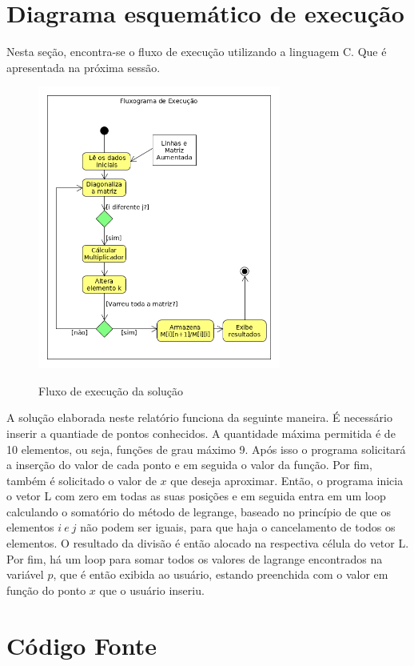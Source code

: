 \documentclass[12pt, hidelinks]{article}
\begin{document}
\newpage
\section{Diagrama esquemático de execução}

Nesta seção, encontra-se o fluxo de execução utilizando a linguagem C. Que é apresentada na próxima sessão.
\begin{figure}[!h]
  \centering
  \includegraphics[width=8cm]{figuras/fluxograma.png}\\
  \caption{Fluxo de execução da solução}\label{fig:fluxo}
\end{figure}
A solução elaborada neste relatório funciona da seguinte maneira. É necessário inserir a quantiade de pontos
conhecidos. A quantidade máxima permitida é de 10 elementos, ou seja, funções de grau máximo 9.
Após isso o programa solicitará a inserção do valor de cada ponto e em seguida o valor da função. Por fim,
também é solicitado o valor de $x$ que deseja aproximar.
Então, o programa inicia o vetor L com zero em todas as suas posições e em seguida entra em um loop calculando
o somatório do método de legrange, baseado no princípio de que os elementos $i~e~j$ não podem ser iguais, para que
haja o cancelamento de todos os elementos. O resultado da divisão é então alocado na respectiva célula do vetor L.
Por fim, há um loop para somar todos os valores de lagrange encontrados na variável $p$, que é então exibida ao
usuário, estando preenchida com o valor em função do ponto $x$ que o usuário inseriu.

\newpage
\section{Código Fonte}
\end{document}
